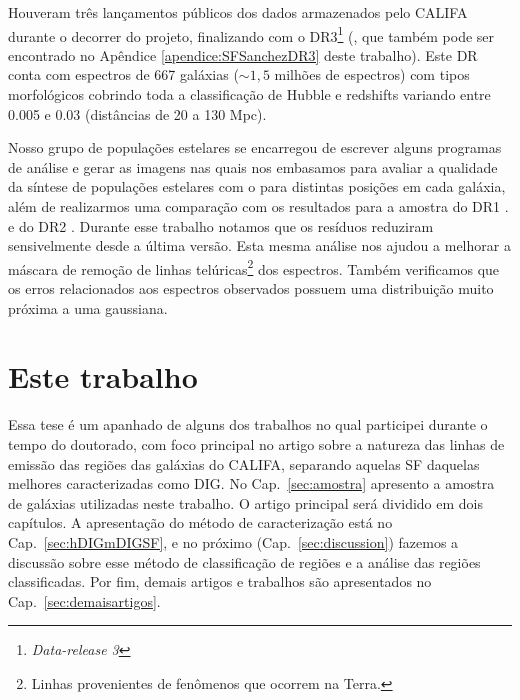 Houveram três lançamentos públicos dos dados armazenados pelo CALIFA durante o decorrer do projeto, finalizando com o DR3\footnote{\em Data-release 3} (\citealt{SFSanchez.DR3.2016}, que também pode ser encontrado no Apêndice \ref{apendice:SFSanchezDR3} deste trabalho). Este DR conta com espectros de 667 galáxias ($\sim 1,5$ milhões de espectros) com tipos morfológicos cobrindo toda a classificação de Hubble e redshifts variando entre 0.005 e 0.03 (distâncias de 20 a 130 Mpc).

Nosso grupo de populações estelares se encarregou de escrever alguns programas de análise e gerar as imagens nas quais nos embasamos para avaliar a qualidade da síntese de populações estelares com o \starlight para distintas posições em cada galáxia, além de realizarmos uma comparação com os resultados para a amostra do DR1 \citep{Husemann.etal.2013a}.  e do DR2 \citealt{GarciaBenito.etal.2015a}. Durante esse trabalho notamos que os resíduos reduziram sensivelmente desde a última versão. Esta mesma análise nos ajudou a melhorar a máscara de remoção de linhas telúricas\footnote{Linhas provenientes de fenômenos que ocorrem na Terra.} dos espectros. Também verificamos que os erros relacionados aos espectros observados possuem uma distribuição muito próxima a uma gaussiana.


\section{Este trabalho}
\label{sec:intro:estetrabalho}

Essa tese é um apanhado de alguns dos trabalhos no qual participei durante o tempo do doutorado, com foco principal no artigo sobre a natureza das linhas de emissão das regiões das galáxias do CALIFA, separando aquelas SF daquelas melhores caracterizadas como DIG. No Cap.\ \ref{sec:amostra} apresento a amostra de galáxias utilizadas neste trabalho. O artigo principal será dividido em dois capítulos. A apresentação do método de caracterização está no Cap.\  \ref{sec:hDIGmDIGSF}, e no próximo (Cap.\ \ref{sec:discussion}) fazemos a discussão sobre esse método de classificação de regiões e a análise das regiões classificadas. Por fim, demais artigos e trabalhos são apresentados no Cap.\ \ref{sec:demaisartigos}.

